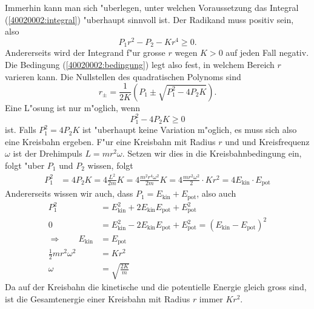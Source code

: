 \begin{diskussion}
Immerhin kann man sich "uberlegen, unter welchen Voraussetzung das
Integral
(\ref{40020002:integral})
"uberhaupt sinnvoll ist. Der Radikand muss positiv sein, also
\begin{equation}
P_1r^2-P_2-Kr^4\ge 0.
\label{40020002:bedingung}
\end{equation}
Andererseits wird der Integrand f"ur grosse $r$ wegen $K>0$ auf
jeden Fall negativ.  Die Bedingung (\ref{40020002:bedingung})
legt also fest, in welchem Bereich $r$ varieren kann. Die Nullstellen
des quadratischen Polynoms sind
\[
r_\pm=\frac{1}{2K}\left(P_1\pm\sqrt{P_1^2-4P_2K}\right).
\]
Eine L"osung ist nur m"oglich, wenn
\[
P_1^2-4P_2K\ge 0
\]
ist.
Falls $P_1^2=4P_2K$ ist "uberhaupt keine Variation m"oglich, es muss
sich also eine Kreisbahn ergeben. F"ur eine Kreisbahn mit Radius $r$ 
und und Kreisfrequenz $\omega$ ist der Drehimpuls $L=mr^2\omega$.
Setzen wir dies in die Kreisbahnbedingung ein, folgt
"uber $P_1$ und $P_2$ wissen, folgt
\begin{align*}
P_1^2&=4P_2K
=
4\frac{L^2}{2m}K
=
4\frac{m^2r^4\omega^2}{2m}K
=
4 \frac{mr^2\omega^2}{2}  \cdot Kr^2
=
4 E_{\text{kin}}\cdot E_{\text{pot}}
\end{align*}
Andererseits wissen wir auch, dass $P_1=E_{\text{kin}}+E_{\text{pot}}$,
also auch
\begin{align*}
P_1^2&=
E_{\text{kin}}^2
+ 2 
E_{\text{kin}}
E_{\text{pot}}
+
E_{\text{pot}}^2
\\
0&=
E_{\text{kin}}^2
- 2 
E_{\text{kin}}
E_{\text{pot}}
+
E_{\text{pot}}^2
=
(E_{\text{kin}}
-
E_{\text{pot}})^2
\\
\Rightarrow\qquad
E_{\text{kin}}
&=
E_{\text{pot}}
\\
\frac12mr^2\omega^2&=Kr^2
\\
\omega&=\sqrt{\frac{2K}{m}}
\end{align*}
Da auf der Kreisbahn die kinetische und die potentielle Energie
gleich gross sind, ist die Gesamtenergie einer Kreisbahn mit Radius
$r$ immer $Kr^2$.
\end{diskussion}
